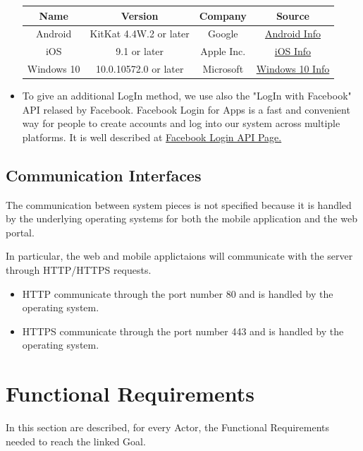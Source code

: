\documentclass{report}
\begin{document}
\begin{itemize}
\begin{center}
\begin{table}[h!]
\begin{center}
								\begin{tabular}{cccc}
									\toprule
									\textbf{Name} & \textbf{Version} & \textbf{Company} & \textbf{Source}\\
									\midrule
									Android & KitKat 4.4W.2 or later & Google & \href{https://www.android.com}{Android Info}\\
									\midrule
									iOS & 9.1 or later & Apple Inc. & \href{http://www.apple.com/ios/}{iOS Info}\\
									\midrule
									Windows 10 & 10.0.10572.0 or later & Microsoft & \href{http://www.microsoft.com/it-it/mobile/windows10/?dcmpid=omc-org-globalsite.globalredirect}{Windows 10 Info}\\
									\bottomrule
								\end{tabular}
							\end{center}
							
						\end{table}
					\end{center}

				\item To give an additional LogIn method, we use also the "LogIn with Facebook" API relased by Facebook. Facebook Login for Apps is a fast and convenient way for people to create accounts and log into our system across multiple platforms. It is well described at \href{https://developers.facebook.com/docs/facebook-login}{Facebook Login API Page.}
			\end{itemize}


		\subsection{Communication Interfaces}
		The communication between system pieces is not specified because it is handled by the underlying operating systems for both the mobile application and the web portal.

		In particular, the web and mobile applictaions will communicate with the server through HTTP/HTTPS requests. 

			\begin{itemize}
				\item HTTP communicate through the port number 80 and is handled by the operating system. 
				\item HTTPS communicate through the port number 443 and is handled by the operating system.
			\end{itemize}

	\section{Functional Requirements}
	In this section are described, for every Actor, the Functional Requirements needed to reach the linked Goal.
\end{document}

